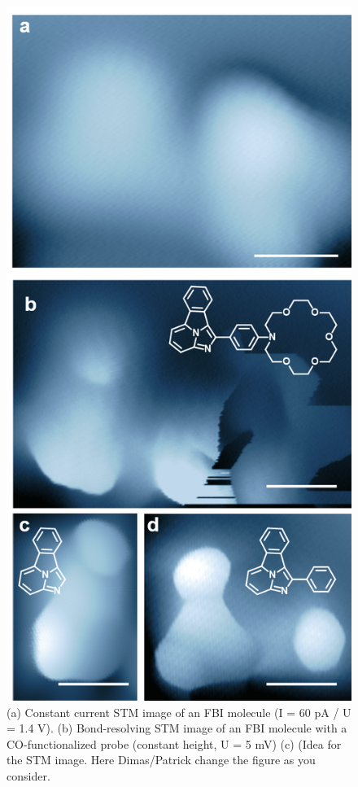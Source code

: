 \documentclass[aps,prl,reprint,longbibliography,superscriptaddress, english]{revtex4-1}
\begin{document}
\begin{figure}[ht!]
	\includegraphics[width=0.9\columnwidth]{figures/Fig_BRSTM.png}
	\caption{\label{FIG_BRSTM.png} 
    (a) Constant current STM image of an FBI molecule (I = 60 pA / U = 1.4 V). (b) Bond-resolving STM image of an FBI molecule with a CO-functionalized probe (constant height, U = 5 mV) (c) (Idea for the STM image. Here Dimas/Patrick change the figure as you consider. }
\end{figure}
\end{document}
